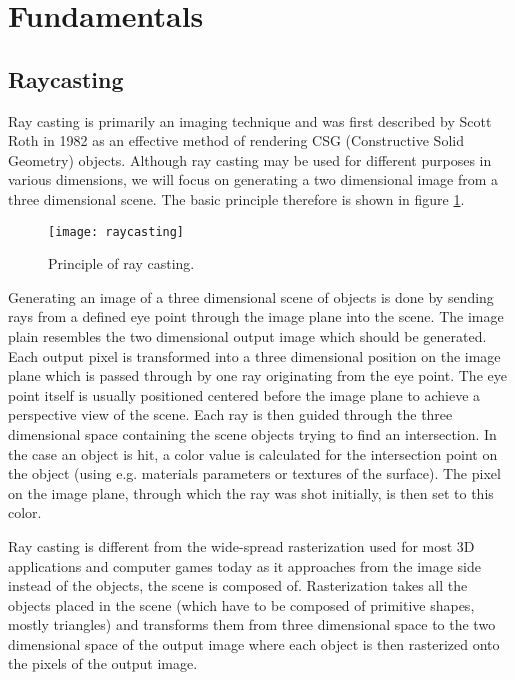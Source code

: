 \section{Fundamentals}
\label{sec:fundamentals}

\subsection{Raycasting}

Ray casting is primarily an imaging technique and was first described by Scott Roth in 1982 as an effective method of rendering CSG (Constructive Solid Geometry) objects. Although ray casting may be used for different purposes in various dimensions, we will focus on generating a two dimensional image from a three dimensional scene. The basic principle therefore is shown in figure \ref{fig:raycasting}. 

\begin{figure}
\centering
\texttt{[image: raycasting]}
\caption{Principle of ray casting.}
\label{fig:raycasting}
\end{figure}

Generating an image of a three dimensional scene of objects is done by sending rays from a defined eye point through the image plane into the scene. The image plain resembles the two dimensional output image which should be generated. Each output pixel is transformed into a three dimensional position on the image plane which is passed through by one ray originating from the eye point. The eye point itself is usually positioned centered before the image plane to achieve a perspective view of the scene. Each ray is then guided through the three dimensional space containing the scene objects trying to find an intersection. In the case an object is hit, a color value is calculated for the intersection point on the object (using e.g. materials parameters or textures of the surface). The pixel on the image plane, through which the ray was shot initially, is then set to this color.

Ray casting is different from the wide-spread rasterization used for most 3D applications and computer games today as it approaches from the image side instead of the objects, the scene is composed of. Rasterization takes all the objects placed in the scene (which have to be composed of primitive shapes, mostly triangles) and transforms them from three dimensional space to the two dimensional space of the output image where each object is then rasterized onto the pixels of the output image.

